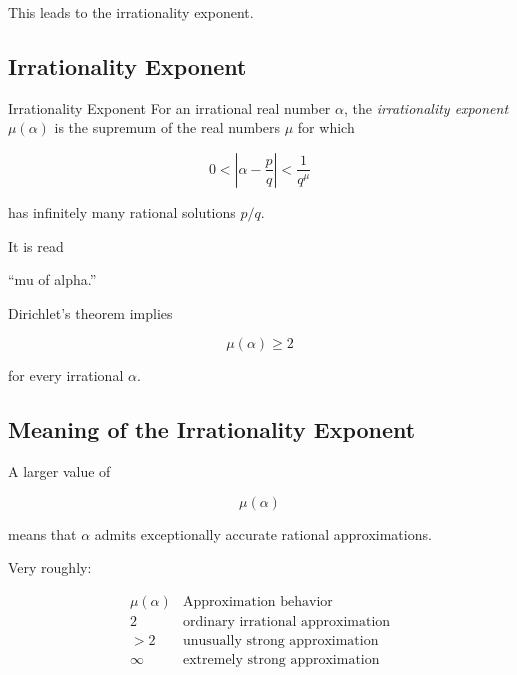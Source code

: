 This leads to the irrationality exponent.

\subsection{Irrationality Exponent}
\label{subsec:irrationality-exponent}

\begin{definitionbox}{Irrationality Exponent}
For an irrational real number \(\alpha\), the \emph{irrationality exponent}
\(\mu(\alpha)\) is the supremum of the real numbers \(\mu\) for which

\[ 0<\left|\alpha-\frac pq\right|<\frac1{q^\mu} \]

has infinitely many rational solutions \(p/q\).
\end{definitionbox}

It is read

\begin{center}
``mu of alpha.''
\end{center}

Dirichlet's theorem implies

\[ \boxed{\mu(\alpha)\geq2} \]

for every irrational \(\alpha\).

\subsection{Meaning of the Irrationality Exponent}
\label{subsec:meaning-irrationality-exponent}

A larger value of

\[ \mu(\alpha) \]

means that \(\alpha\) admits exceptionally accurate rational approximations.

Very roughly:

\[
\begin{array}{c|c}
\mu(\alpha) & \text{Approximation behavior}\\
\hline
2 & \text{ordinary irrational approximation}\\
>2 & \text{unusually strong approximation}\\
\infty & \text{extremely strong approximation}
\end{array}
\]

